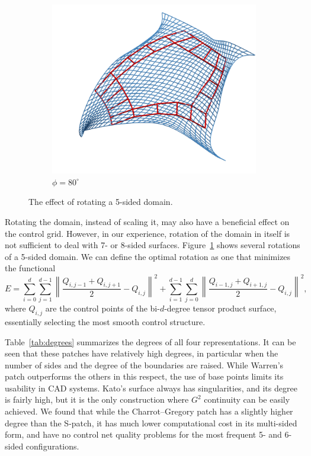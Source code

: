 \documentclass[9pt,academicons]{article}
\begin{document}
\begin{figure}[!ht]
{\begin{subfigure}{.28\textwidth}
      \centering
      \includegraphics[width=\textwidth]{images/rotations/80.png}
      \caption{$\phi=80^\circ$}
    \end{subfigure}
    \hfill
  }

  \caption{The effect of rotating a 5-sided domain.}
  \label{fig:rotations}
\end{figure}
Rotating the domain, instead of scaling it, may also have a beneficial effect
on the control grid. However, in our experience, rotation of the domain in itself
is not sufficient to deal with 7- or 8-sided surfaces.
Figure~\ref{fig:rotations} shows several rotations of a 5-sided domain.
We can define the optimal rotation as one that minimizes the functional
\begin{equation}
  E = \sum_{i=0}^d\sum_{j=1}^{d-1}\left\|\frac{Q_{i,j-1}+Q_{i,j+1}}{2}-Q_{i,j}\right\|^2 +
  \sum_{i=1}^{d-1}\sum_{j=0}^d\left\|\frac{Q_{i-1,j}+Q_{i+1,j}}{2}-Q_{i,j}\right\|^2,
\end{equation}
where $Q_{i,j}$ are the control points of the bi-$d$-degree tensor product surface,
essentially selecting the most smooth control structure.

Table~\ref{tab:degrees} summarizes the degrees of all four representations.
It can be seen that these patches
have relatively high degrees, in particular when the number of sides and the degree of the
boundaries are raised. While Warren's patch outperforms the others in this respect,
the use of base points limits its usability in CAD systems.
Kato's surface always has singularities, and its degree is fairly high, but it is the only
construction where $G^2$ continuity can be easily achieved. We found that while the
Charrot--Gregory patch has a slightly higher degree than the S-patch, it has much lower
computational cost in its multi-sided form, and have no control net quality problems for
the most frequent 5- and 6-sided configurations.
\end{document}
